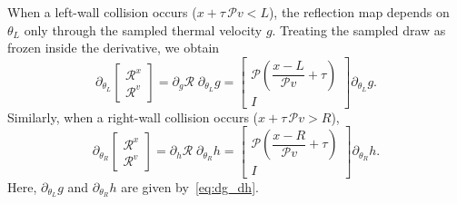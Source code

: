 \documentclass[12pt,nopreprintline]{elsarticle}
\begin{document}
When a left-wall collision occurs ($x+\tau\,\mathcal P v<L$), the reflection map depends on $\theta_L$ only through the sampled thermal velocity $g$. Treating the sampled draw as frozen inside the derivative, we obtain
{
\begin{equation}
\partial_{\theta_L}
\begin{bmatrix}
\mathcal R^x\\ \mathcal R^v
\end{bmatrix}
=
\partial_g \mathcal R \;\partial_{\theta_L} g
=
\begin{bmatrix}
\mathcal P\!\left(\dfrac{x-L}{\mathcal P v}+\tau\right)\\[0.3em]
I
\end{bmatrix}
\partial_{\theta_L} g .
\end{equation}
Similarly, when a right-wall collision occurs ($x+\tau\,\mathcal P v>R$),
\begin{equation}
\partial_{\theta_R}
\begin{bmatrix}
\mathcal R^x\\ \mathcal R^v
\end{bmatrix}
=
\partial_h \mathcal R \;\partial_{\theta_R} h
=
\begin{bmatrix}
\mathcal P\!\left(\dfrac{x-R}{\mathcal P v}+\tau\right)\\[0.3em]
I
\end{bmatrix}
\partial_{\theta_R} h .
\end{equation}
Here, $\partial_{\theta_L} g$ and $\partial_{\theta_R} h$ are given by~\eqref{eq:dg_dh}.
}
\end{document}
